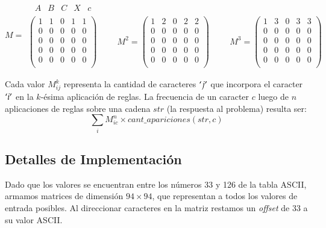$$M =
\begin{array}{l}
\begin{matrix}
	\ \ A & B & C & X & c
\end{matrix} \\
\left(
	\begin{array}{ccccc}
	1 & 1 & 0 & 1 & 1 \\
	0 & 0 & 0 & 0 & 0 \\
	0 & 0 & 0 & 0 & 0 \\
	0 & 0 & 0 & 0 & 0 \\
	0 & 0 & 0 & 0 & 0 \\
	\end{array}
\right)
\hspace{1cm}
M^2 = \left(
\begin{array}{ccccc}
1 & 2 & 0 & 2 & 2 \\
0 & 0 & 0 & 0 & 0 \\
0 & 0 & 0 & 0 & 0 \\
0 & 0 & 0 & 0 & 0 \\
0 & 0 & 0 & 0 & 0 \\
\end{array}
\right)
\hspace{1cm}
M^3 = \left(
\begin{array}{ccccc}
1 & 3 & 0 & 3 & 3 \\
0 & 0 & 0 & 0 & 0 \\
0 & 0 & 0 & 0 & 0 \\
0 & 0 & 0 & 0 & 0 \\
0 & 0 & 0 & 0 & 0 \\
\end{array}
\right)
\end{array}
$$

Cada valor $M_{ij}^k$ representa la cantidad de caracteres $`j'$ que incorpora
el caracter $`i'$ en la $k$-ésima aplicación de reglas. La frecuencia
de un caracter $c$ luego de $n$ aplicaciones de reglas sobre una cadena $str$
(la respuesta al problema) resulta ser:
$$\sum_i M_{ic}^n \times cant\_apariciones(str, c)$$


\subsection*{Detalles de Implementación}

Dado que los valores se encuentran entre los números 33 y 126 de la tabla ASCII,
armamos matrices de dimensión $94\times 94$, que representan a todos los valores
de entrada posibles. Al direccionar caracteres en la matriz restamos un {\sl offset}
de 33 a su valor ASCII.

